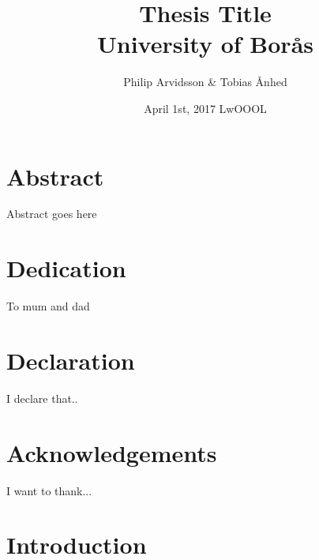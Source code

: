 \documentclass[11pt,twoside,openright]{report}
\begin{document}
\title{
  {Thesis Title}\\
  {\large University of Borås}\\
}

\author{Philip Arvidsson \& Tobias Ånhed}

\date{April 1st, 2017 LwOOOL}

\maketitle

\chapter*{Abstract}
Abstract goes here

\chapter*{Dedication}
To mum and dad

\chapter*{Declaration}
I declare that..

\chapter*{Acknowledgements}
I want to thank...

\tableofcontents

\chapter{Introduction}

\end{document}
